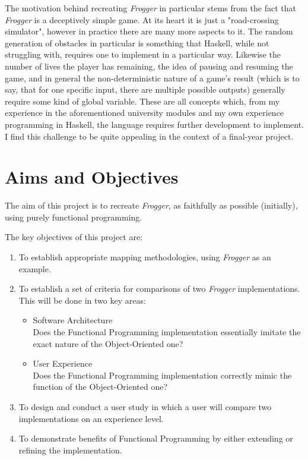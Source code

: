 \documentclass[12pt, a4paper]{report}
\begin{document}
\par

The motivation behind recreating \textit{Frogger} in particular stems from the fact that \textit{Frogger} is a deceptively simple game.
At its heart it is just a "road-crossing simulator", however in practice there are many more aspects to it.
The random generation of obstacles in particular is something that Haskell, while not struggling with, requires one to implement in a particular way.
Likewise the number of lives the player has remaining, the idea of pausing and resuming the game, and in general the non-deterministic nature of a game's result (which is to say, that for one specific input, there are multiple possible outputs) generally require some kind of global variable.
These are all concepts which, from my experience in the aforementioned university modules and my own experience programming in Haskell, the language requires further development to implement.
I find this challenge to be quite appealing in the context of a final-year project.

\section{Aims and Objectives}
The aim of this project is to recreate \textit{Frogger}, as faithfully as possible (initially), using purely functional programming.

The key objectives of this project are:
\begin{enumerate}
  \item To establish appropriate mapping methodologies, using \textit{Frogger} as an example.
  \item To establish a set of criteria for comparisons of two \textit{Frogger} implementations.\\
        This will be done in two key areas:
    \begin{itemize}
      \item Software Architecture\\
        Does the Functional Programming implementation essentially imitate the exact nature of the Object-Oriented one?
      \item User Experience\\
        Does the Functional Programming implementation correctly mimic the function of the Object-Oriented one?
    \end{itemize}
  \item To design and conduct a user study in which a user will compare two implementations on an experience level.
  \item To demonstrate benefits of Functional Programming by either extending or refining the implementation.
\end{enumerate}
\end{document}
